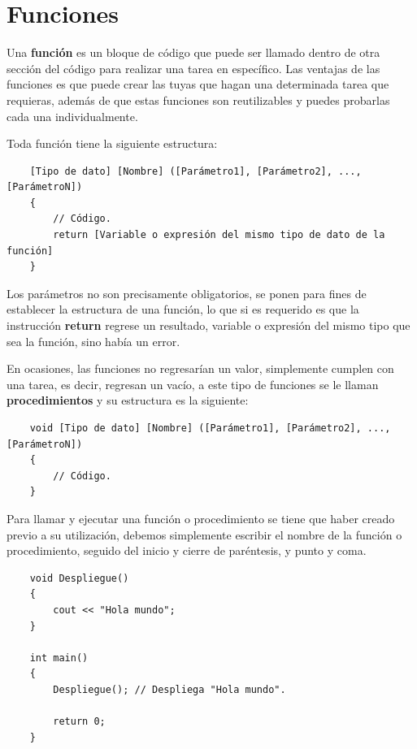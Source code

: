 \section{Funciones}
\hspace{0.55cm}Una \textbf{función} es un bloque de código que puede ser llamado dentro de otra sección del código para realizar una tarea en específico. Las ventajas de las funciones es que puede crear las tuyas que hagan una determinada tarea que requieras, además de que estas funciones son reutilizables y puedes probarlas cada una individualmente.

Toda función tiene la siguiente estructura:
\begin{lstlisting}
    [Tipo de dato] [Nombre] ([Parámetro1], [Parámetro2], ..., [ParámetroN])
    {
        // Código.
        return [Variable o expresión del mismo tipo de dato de la función]
    }
\end{lstlisting}

Los parámetros no son precisamente obligatorios, se ponen para fines de establecer la estructura de una función, lo que si es requerido es que la instrucción \textbf{return} regrese un resultado, variable o expresión del mismo tipo que sea la función, sino había un error.

En ocasiones, las funciones no regresarían un valor, simplemente cumplen con una tarea, es decir, regresan un vacío, a este tipo de funciones se le llaman \textbf{procedimientos} y su estructura es la siguiente:
\begin{lstlisting}
    void [Tipo de dato] [Nombre] ([Parámetro1], [Parámetro2], ..., [ParámetroN])
    {
        // Código.
    }
\end{lstlisting}

Para llamar y ejecutar una función o procedimiento se tiene que haber creado previo a su utilización, debemos simplemente escribir el nombre de la función o procedimiento, seguido del inicio y cierre de paréntesis, y punto y coma.
\begin{lstlisting}
    void Despliegue()
    {
        cout << "Hola mundo";
    }
    
    int main()
    {
        Despliegue(); // Despliega "Hola mundo".
        
        return 0;
    }
\end{lstlisting}

